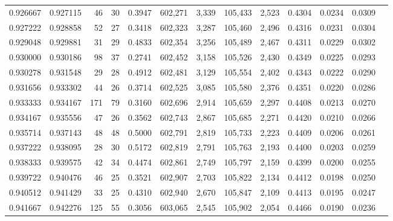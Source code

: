 \begin{tabular}{rrrrrrrrrrrrr}
0.926667 & 0.927115 &     46 &    30 &                                     0.3947 & 602,271 &   3,339 & 105,433 &   2,523 & 0.4304 & 0.0234 & 0.0309 \\
0.927222 & 0.928858 &     52 &    27 &                                     0.3418 & 602,323 &   3,287 & 105,460 &   2,496 & 0.4316 & 0.0231 & 0.0304 \\
0.929048 & 0.929881 &     31 &    29 &                                     0.4833 & 602,354 &   3,256 & 105,489 &   2,467 & 0.4311 & 0.0229 & 0.0302 \\
0.930000 & 0.930186 &     98 &    37 &                                     0.2741 & 602,452 &   3,158 & 105,526 &   2,430 & 0.4349 & 0.0225 & 0.0293 \\
0.930278 & 0.931548 &     29 &    28 &                                     0.4912 & 602,481 &   3,129 & 105,554 &   2,402 & 0.4343 & 0.0222 & 0.0290 \\
0.931656 & 0.933302 &     44 &    26 &                                     0.3714 & 602,525 &   3,085 & 105,580 &   2,376 & 0.4351 & 0.0220 & 0.0286 \\
0.933333 & 0.934167 &    171 &    79 &                                     0.3160 & 602,696 &   2,914 & 105,659 &   2,297 & 0.4408 & 0.0213 & 0.0270 \\
0.934167 & 0.935556 &     47 &    26 &                                     0.3562 & 602,743 &   2,867 & 105,685 &   2,271 & 0.4420 & 0.0210 & 0.0266 \\
0.935714 & 0.937143 &     48 &    48 &                                     0.5000 & 602,791 &   2,819 & 105,733 &   2,223 & 0.4409 & 0.0206 & 0.0261 \\
0.937222 & 0.938095 &     28 &    30 &                                     0.5172 & 602,819 &   2,791 & 105,763 &   2,193 & 0.4400 & 0.0203 & 0.0259 \\
0.938333 & 0.939575 &     42 &    34 &                                     0.4474 & 602,861 &   2,749 & 105,797 &   2,159 & 0.4399 & 0.0200 & 0.0255 \\
0.939722 & 0.940476 &     46 &    25 &                                     0.3521 & 602,907 &   2,703 & 105,822 &   2,134 & 0.4412 & 0.0198 & 0.0250 \\
0.940512 & 0.941429 &     33 &    25 &                                     0.4310 & 602,940 &   2,670 & 105,847 &   2,109 & 0.4413 & 0.0195 & 0.0247 \\
0.941667 & 0.942276 &    125 &    55 &                                     0.3056 & 603,065 &   2,545 & 105,902 &   2,054 & 0.4466 & 0.0190 & 0.0236 \\

\end{tabular}
